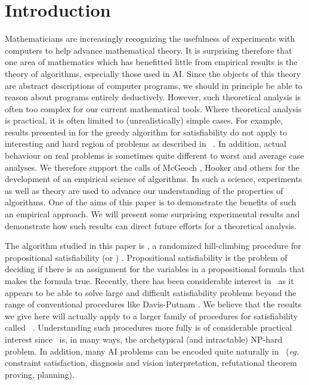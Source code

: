 \vspace{-0.075cm}

\section{Introduction}
\label{sec-intro}
 
Mathematicians are increasingly recognizing the 
usefulness of experiments with computers to help advance 
mathematical theory. 
It is surprising therefore that one area of
mathematics which has benefitted little from empirical results
is the theory of algorithms, especially those used in AI. 
Since the objects of this theory 
are abstract descriptions of computer programs,
we should in principle be able to 
reason about programs
entirely deductively. However, such theoretical
analysis is often too complex for our current mathematical
tools. Where theoretical analysis is practical,
it is often limited to (unrealistically) simple cases. 
For example, 
results presented in \cite{greedy-alg} for 
the greedy algorithm for satisfiability do not apply 
to interesting and hard region of problems as described 
in ~.
In addition, actual behaviour on real problems is sometimes
quite different to worst and average case analyses.
We therefore support the calls of McGeoch \cite{mcgeoch1}, Hooker 
\cite{hooker1} and others for the development
of an empirical science of algorithms. In such a science,
experiments as well as theory are used to advance our
understanding of the properties of algorithms. 
One of the aims of this paper is to demonstrate the
benefits of such an empirical approach. 
We will present some surprising experimental results
and demonstrate how such results can direct future
efforts for a theoretical analysis.

The algorithm studied in this paper
is \GSAT, a randomized hill-climbing procedure for 
propositional satisfiability (or \SAT) \cite{selman-gsat,gsat-ext}. 
Propositional satisfiability is the problem of deciding 
if there is an assignment for the variables in 
a propositional formula that makes the formula true. 
Recently, there has been considerable interest
in \GSAT\ as it appears to be able to solve large
and difficult satisfiability problems beyond the range of
conventional procedures like Davis-Putnam \cite{selman-gsat}.
We believe that the results we give
here will actually apply to a larger family of 
procedures for satisfiability called \GenSAT\ \cite{gensat}.
Understanding such procedures more fully is of considerable 
practical interest since \SAT\ is, in many
ways, the archetypical (and intractable)
NP-hard problem. In addition, many AI problems
can be encoded quite naturally in \SAT\
({\it eg.}  constraint satisfaction, diagnosis
and vision interpretation, refutational theorem proving, planning). 

